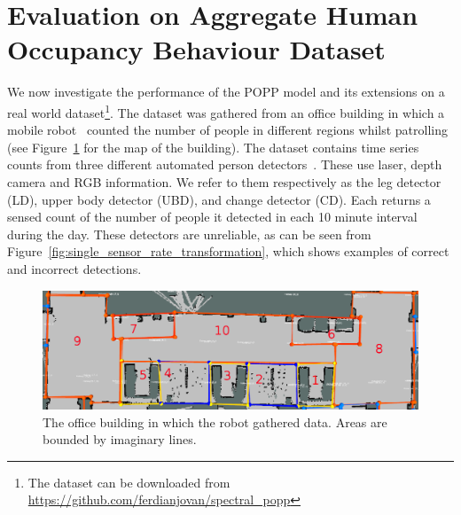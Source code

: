 
\section{Evaluation on Aggregate Human Occupancy Behaviour Dataset}
\label{sec:evareal}

We now investigate the performance of the POPP model and its extensions on a real world dataset\footnote{The dataset can be downloaded from \url{https://github.com/ferdianjovan/spectral_popp}}.
% 
The dataset was gathered from an office building in which a mobile robot~\cite{hawes2016strands} counted the number of people in different regions whilst patrolling (see Figure~\ref{fig:map_popp_independent_test} for the map of the building). The dataset contains time series  counts from three different automated person detectors~\cite{dondrup2015real}. These use laser, depth camera and RGB information. We refer to them respectively as the leg detector (LD), upper body detector (UBD), and change detector (CD). Each returns a sensed count of the number of people it detected in each 10 minute interval during the day. These detectors are unreliable, as can be seen from Figure~\ref{fig:single_sensor_rate_transformation}, which shows examples of correct and incorrect detections.

\begin{figure}[t]
	\centering
	\includegraphics[width=0.95\columnwidth]{./figures/map_popp.png}
	\caption{The office building in which the robot gathered data. Areas are bounded by imaginary lines.}
	\label{fig:map_popp_independent_test}
\end{figure}

